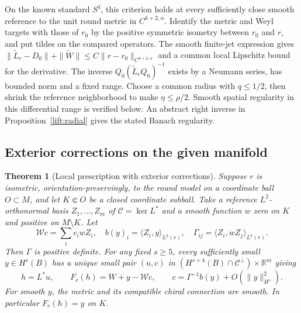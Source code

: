 \documentclass[11pt]{article}
\numberwithin{equation}{section}
\newtheorem{theorem}{Theorem}[section]
\theoremstyle{definition}
\theoremstyle{remark}
\begin{document}
On the known standard \(S^4\), this criterion holds at every sufficiently
close smooth reference to the unit round metric in \(C^{k+2,\alpha}\).
Identify the metric and Weyl targets with those of \(r_0\) by the
positive symmetric isometry between \(r_0\) and \(r\), and put tildes
on the compared operators. The smooth finite-jet expression gives
\(\|\widetilde L_r-D_0\|+\|\widetilde W\|
\le C\|r-r_0\|_{C^{k+2,\alpha}}\) and a common local Lipschitz bound
for the derivative. The inverse
\(Q_0(\widetilde L_rQ_0)^{-1}\) exists by a Neumann series,
has bounded norm and a fixed range. Choose a common radius with
\(q\le1/2\), then shrink the reference neighborhood to make
\(\eta\le\rho/2\). Smooth spatial regularity in this differential
range is verified below. An abstract right inverse in
Proposition~\ref{lift:radial} gives the stated Banach regularity.

\subsection{Exterior corrections on the given manifold}

\begin{theorem}[Local prescription with exterior corrections]\label{lift:exterior}
Suppose \(r\) is isometric, orientation-preservingly, to the round
model on a coordinate ball \(O\subset M\), and let \(K\Subset O\)
be a closed coordinate subball. Take a reference \(L^2\)-orthonormal
basis \(Z_1,\ldots,Z_m\) of \(\mathcal C=\ker L^*\) and a smooth
function \(w\) zero on \(K\) and positive on \(M\setminus K\).
Let
\[
 \mathcal Wc=\sum_i c_i wZ_i,\quad
 b(y)_i=\langle Z_i,y\rangle_{L^2(r)},\quad
 \Gamma_{ij}=\langle Z_i,wZ_j\rangle_{L^2(r)} .
\]
Then \(\Gamma\) is positive definite. For any fixed \(s\ge5\), every
sufficiently small \(y\in H^s(B)\) has a unique small pair \((u,c)\)
in \((H^{s+4}(B)\cap\mathcal C^\perp)\times\mathbb R^m\) giving
\begin{equation}\label{lift:corrected}
 h=L^*u,\qquad F_r(h)=W+y-\mathcal Wc,\qquad
 c=\Gamma^{-1}b(y)+O(\|y\|_{H^s}^2).
\end{equation}
For smooth \(y\), the metric and its compatible chiral connection
are smooth. In particular \(F_r(h)=y\) on \(K\).
\end{theorem}
\end{document}
